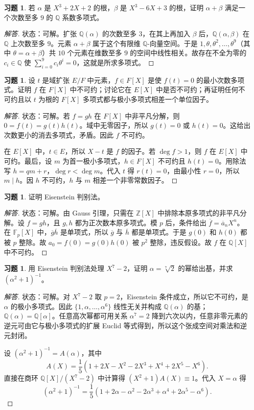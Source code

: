 \documentclass[11pt,a4paper,openany]{ctexbook}
\numberwithin{equation}{chapter}
\newcommand{\Q}{\mathbb{Q}}
\newcommand{\Z}{\mathbb{Z}}
\newcommand{\F}{\mathbb{F}}
\theoremstyle{plain}
\theoremstyle{definition}
\newtheorem{exercise}[theorem]{习题}
\theoremstyle{remark}
\begin{document}
\begin{exercise}
若 $\alpha$ 是 $X^3+2X+2$ 的根，$\beta$ 是 $X^3-6X+3$ 的根，证明 $\alpha+\beta$ 满足一个次数至多 $9$ 的 $\Q$ 系数多项式。
\end{exercise}
\begin{proof}[解答]
状态：可解。扩张 $\Q(\alpha)$ 的次数至多 $3$，在其上再加入 $\beta$ 后，$\Q(\alpha,\beta)$ 在 $\Q$ 上次数至多 $9$。元素 $\alpha+\beta$ 属于这个有限维 $\Q$-向量空间。于是 $1,\theta,\theta^2,\dots,\theta^9$（其中 $\theta=\alpha+\beta$）共 $10$ 个元素在维数至多 $9$ 的空间中线性相关。故存在不全为零的 $c_i\in\Q$ 使 $\sum_{i=0}^9c_i\theta^i=0$，这就是所求多项式。
\end{proof}

\begin{exercise}
设 $t$ 是域扩张 $E/F$ 中元素，$f\in F[X]$ 是使 $f(t)=0$ 的最小次数多项式。证明 $f$ 在 $F[X]$ 中不可约；讨论它在 $E[X]$ 中是否不可约；再证明任何不可约且以 $t$ 为根的 $F[X]$ 多项式都与极小多项式相差一个单位因子。
\end{exercise}
\begin{proof}[解答]
状态：可解。若 $f=gh$ 在 $F[X]$ 中非平凡分解，则 $0=f(t)=g(t)h(t)$。域中无零因子，所以 $g(t)=0$ 或 $h(t)=0$。这给出次数更小的消去多项式，矛盾。因此 $f$ 不可约。

在 $E[X]$ 中，$t\in E$，所以 $X-t$ 是 $f$ 的因子。若 $\deg f>1$，则 $f$ 在 $E[X]$ 中可约。最后，设 $m$ 为首一极小多项式，$h\in F[X]$ 不可约且 $h(t)=0$。用除法写 $h=qm+r$，$\deg r<\deg m$。代入 $t$ 得 $r(t)=0$，由最小性 $r=0$，所以 $m\mid h$。因 $h$ 不可约，$h$ 与 $m$ 相差一个非零常数因子。
\end{proof}

\begin{exercise}
证明 Eisenstein 判别法。
\end{exercise}
\begin{proof}[解答]
状态：可解。由 Gauss 引理，只需在 $\Z[X]$ 中排除本原多项式的非平凡分解。设 $f=gh$，且 $g,h$ 都为正次数本原多项式。模 $p$ 后，条件给出 $\overline f=\overline a_nX^n$。在 $\F_p[X]$ 中，$\overline g\overline h$ 是单项式，所以 $\overline g$ 与 $\overline h$ 都是单项式。于是 $g(0)$ 和 $h(0)$ 都被 $p$ 整除。故 $a_0=f(0)=g(0)h(0)$ 被 $p^2$ 整除，违反假设。故 $f$ 在 $\Q[X]$ 中不可约。
\end{proof}

\begin{exercise}
用 Eisenstein 判别法处理 $X^7-2$，证明 $\alpha=\sqrt[7]{2}$ 的幂给出基，并求 $(\alpha^2+1)^{-1}$。
\end{exercise}
\begin{proof}[解答]
状态：可解。对 $X^7-2$ 取 $p=2$，Eisenstein 条件成立，所以它不可约，是 $\alpha$ 的极小多项式。因此 $\{1,\alpha,\dots,\alpha^6\}$ 线性无关并构成 $\Q(\alpha)$ 的基；$\Q(\alpha)=\Q[\alpha]$。任意高次幂都可用关系 $\alpha^7=2$ 降到六次以内，任意非零元素的逆元可由它与极小多项式的扩展 Euclid 等式得到，所以这个张成空间对乘法和逆元封闭。

设 $(\alpha^2+1)^{-1}=A(\alpha)$，其中
\[
A(X)=\frac15(1+2X-X^2-2X^3+X^4+2X^5-X^6).
\]
直接在商环 $\Q[X]/(X^7-2)$ 中计算得 $(X^2+1)A(X)\equiv1$。代入 $X=\alpha$ 得
\[
(\alpha^2+1)^{-1}=\frac15(1+2\alpha-\alpha^2-2\alpha^3+\alpha^4+2\alpha^5-\alpha^6).
\]
\end{proof}
\end{document}
